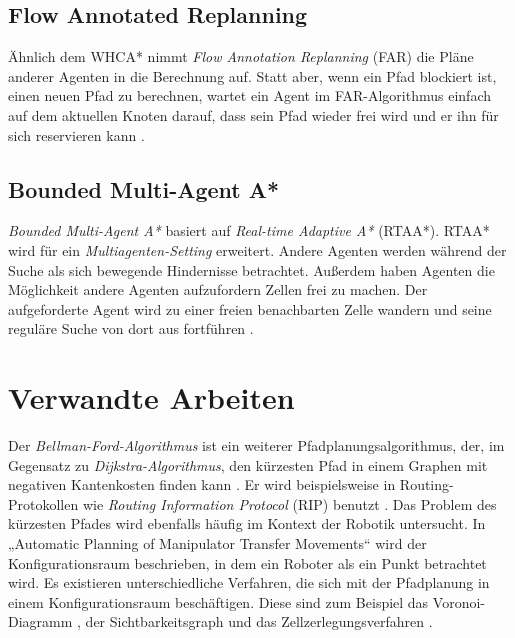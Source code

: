 \subsection{Flow Annotated Replanning}
Ähnlich dem WHCA* nimmt \textit{Flow Annotation Replanning} (FAR) die Pläne anderer Agenten in die Berechnung auf. Statt aber, wenn ein Pfad blockiert ist, einen neuen Pfad zu berechnen, wartet ein Agent im FAR-Algorithmus einfach auf dem aktuellen Knoten darauf, dass sein Pfad wieder frei wird und er ihn für sich reservieren kann \cite[S.3]{Sigurdson.2019}.

\subsection{Bounded Multi-Agent A*}
\textit{Bounded Multi-Agent A*} basiert auf \textit{Real-time Adaptive A*} (RTAA*). RTAA* wird für ein \textit{Multiagenten-Setting} erweitert. Andere Agenten werden während der Suche als sich bewegende Hindernisse betrachtet. Außerdem haben Agenten die Möglichkeit andere Agenten aufzufordern Zellen frei zu machen. Der aufgeforderte Agent wird zu einer freien benachbarten Zelle wandern und seine reguläre Suche von dort aus fortführen \cite[S.3]{Sigurdson.2019}.

\newpage
\section{Verwandte Arbeiten}

\begin{sloppypar}
	
Der \textit{Bellman-Ford-Algorithmus} ist ein weiterer Pfadplanungsalgorithmus, der, im Gegensatz zu \textit{Dijkstra-Algorithmus}, den kürzesten Pfad in einem Graphen mit negativen Kantenkosten finden kann \cite{Bel58}. Er wird beispielsweise in Routing-Protokollen wie \textit{Routing Information Protocol} (RIP) benutzt \cite{Hed88}.
Das Problem des kürzesten Pfades wird ebenfalls häufig im Kontext der Robotik untersucht. In „Automatic Planning of Manipulator Transfer Movements“ \cite{LP80} wird der Konfigurationsraum beschrieben, in dem ein Roboter als ein Punkt betrachtet wird. Es existieren unterschiedliche Verfahren, die sich mit der Pfadplanung in einem Konfigurationsraum beschäftigen. Diese sind zum Beispiel das Voronoi-Diagramm \cite{Lee82}, der Sichtbarkeitsgraph \cite{LPAW79} und das Zellzerlegungsverfahren \cite{Cai09} .
\end{sloppypar}
